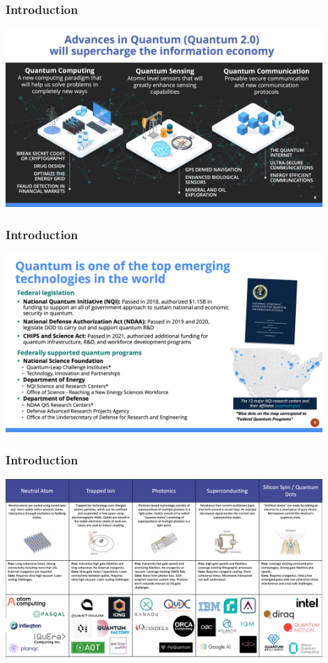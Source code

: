 \documentclass{beamer}
\begin{document}
\begin{frame}\frametitle{Introduction}
\begin{center}
\includegraphics[width=12cm]{fig/Slide8.jpeg}
\end{center}
\end{frame}

\begin{frame}\frametitle{Introduction}
\begin{center}
\includegraphics[width=12cm]{fig/Slide9.jpeg}
\end{center}
\end{frame}

\begin{frame}\frametitle{Introduction}
\begin{center}
\includegraphics[width=12cm]{fig/Slide10.jpeg}
\end{center}
\end{frame}
\end{document}
